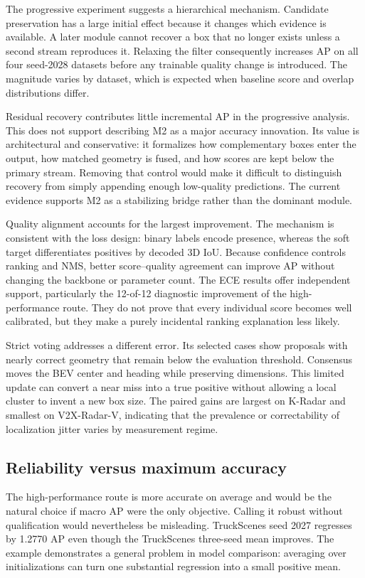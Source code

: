 \documentclass[final,5p,times]{elsarticle}
\begin{document}
The progressive experiment suggests a hierarchical mechanism. Candidate
preservation has a large initial effect because it changes which evidence is
available. A later module cannot recover a box that no longer exists unless a
second stream reproduces it. Relaxing the filter consequently increases AP on
all four seed-2028 datasets before any trainable quality change is introduced.
The magnitude varies by dataset, which is expected when baseline score and
overlap distributions differ.

Residual recovery contributes little incremental AP in the progressive analysis.
This does not support describing M2 as a major accuracy innovation. Its value
is architectural and conservative: it formalizes how complementary boxes enter
the output, how matched geometry is fused, and how scores are kept below the
primary stream. Removing that control would make it difficult to distinguish
recovery from simply appending enough low-quality predictions. The current
evidence supports M2 as a stabilizing bridge rather than the dominant module.

Quality alignment accounts for the largest improvement. The mechanism is
consistent with the loss design: binary labels encode presence, whereas the
soft target differentiates positives by decoded 3D IoU. Because confidence
controls ranking and NMS, better score--quality agreement can improve AP
without changing the backbone or parameter count. The ECE results offer
independent support, particularly the 12-of-12 diagnostic improvement of the
high-performance route. They do not prove that every individual score becomes
well calibrated, but they make a purely incidental ranking explanation less
likely.

Strict voting addresses a different error. Its selected cases show proposals
with nearly correct geometry that remain below the evaluation threshold.
Consensus moves the BEV center and heading while preserving dimensions. This
limited update can convert a near miss into a true positive without allowing a
local cluster to invent a new box size. The paired gains are largest on
K-Radar and smallest on V2X-Radar-V, indicating that the prevalence or
correctability of localization jitter varies by measurement regime.

\subsection{Reliability versus maximum accuracy}

The high-performance route is more accurate on average and would be the natural
choice if macro AP were the only objective. Calling it robust without
qualification would nevertheless be misleading. TruckScenes seed 2027
regresses by 1.2770 AP even though the TruckScenes three-seed mean improves.
The example demonstrates a general problem in model comparison: averaging
over initializations can turn one substantial regression into a small positive
mean.
\end{document}
